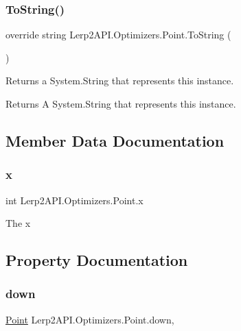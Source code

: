 \subsubsection{\texorpdfstring{To\+String()}{ToString()}}
{\footnotesize\ttfamily override string Lerp2\+A\+P\+I.\+Optimizers.\+Point.\+To\+String (\begin{DoxyParamCaption}{ }\end{DoxyParamCaption})\hspace{0.3cm}{\ttfamily [inline]}}



Returns a System.\+String that represents this instance. 

\begin{DoxyReturn}{Returns}
A System.\+String that represents this instance.
\end{DoxyReturn}


\subsection{Member Data Documentation}
\mbox{\label{struct_lerp2_a_p_i_1_1_optimizers_1_1_point_a43880eb415c1aa7d86bcd1bc7d4951ee}} 
\subsubsection{\texorpdfstring{x}{x}}
{\footnotesize\ttfamily int Lerp2\+A\+P\+I.\+Optimizers.\+Point.\+x}



The x 



\subsection{Property Documentation}
\mbox{\label{struct_lerp2_a_p_i_1_1_optimizers_1_1_point_a3748094e3715e5574cab355fd63adea2}} 
\subsubsection{\texorpdfstring{down}{down}}
{\footnotesize\ttfamily \hyperlink{struct_lerp2_a_p_i_1_1_optimizers_1_1_point}{Point} Lerp2\+A\+P\+I.\+Optimizers.\+Point.\+down\hspace{0.3cm}{\ttfamily [static]}, {\ttfamily [get]}}



